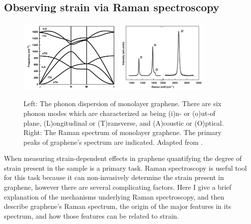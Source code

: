 \documentclass[edeposit,fullpage,draftthesis]{uiucthesis2009}
\begin{document}
        
        \subsection{Observing strain via Raman spectroscopy}
        \label{sec:bg:raman}
        
            \begin{figure}
            \centering
            \includegraphics[width=0.45\textwidth]{images/background/graphene_phonons.png}
            \includegraphics[width=0.41\textwidth]{images/background/graphene_raman2.png}
            \caption[Phonon dispersion and Raman spectrum of monolayer graphene]{
            Left: The phonon dispersion of monolayer graphene. There are six phonon modes which
            are characterized as being (i)n- or (o)ut-of plane, (L)ongitudinal or (T)ransverse,
            and (A)coustic or (O)ptical.
            Right: The Raman spectrum of monolayer graphene. The primary peaks of graphene's spectrum are indicated.
            Adapted from \cite{malard2009raman}.
            }
            \label{fig:graphene_raman}
            \end{figure}
       
        When measuring strain-dependent effects in graphene quantifying the degree of strain present in 
        the sample is a primary task. Raman spectroscopy is useful tool for this task because it can
        non-invasively determine the strain present in graphene, however there are several complicating factors.
        Here I give a brief explanation of the mechanisms underlying Raman spectroscopy, and then
        describe graphene's Raman spectrum, the origin of the major features in its spectrum,
        and how those features can be related to strain.
        
\end{document}
